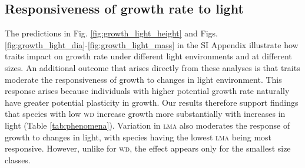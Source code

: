 \documentclass[9pt,twocolumn,twoside,lineno]{pnas-new}
\newcommand{\lma}{\textsc{lma}}
\newcommand{\wood}{\textsc{wd}}
\begin{document}
\subsection*{Responsiveness of growth rate to light}

The predictions in Fig. \ref{fig:growth_light_height} and Figs. \ref{fig:growth_light_dia}-\ref{fig:growth_light_mass} in the SI Appendix illustrate how traits impact on growth rate under different light environments and at different sizes. An additional outcome that arises directly from these analyses is that traits moderate the responsiveness of growth to changes in light environment. This response arises because individuals with higher potential growth rate naturally have greater potential plasticity in growth. Our results therefore support findings that species with low {\wood} increase growth more substantially with increases in light (Table \ref{tab:phenomena}). Variation in {\lma} also moderates the response of growth to changes in light, with species having the lowest {\lma} being most responsive. However, unlike for {\wood}, the effect appears only for the smallest size classes.
\end{document}
